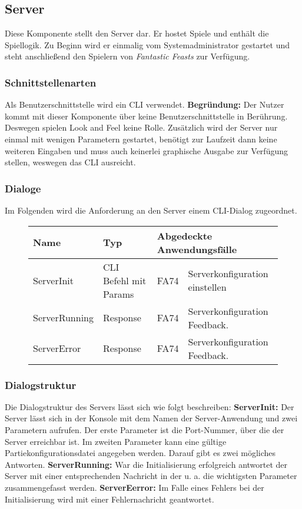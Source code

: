 \subsection{Server}
Diese Komponente stellt den Server dar. Er hostet Spiele und enthält die Spiellogik. Zu Beginn wird er einmalig vom Systemadministrator gestartet und steht anschließend den Spielern von \textit{Fantastic Feasts} zur Verfügung.

\subsubsection{Schnittstellenarten}
Als Benutzerschnittstelle wird ein CLI verwendet. \textbf{Begründung:} Der Nutzer kommt mit dieser Komponente über keine Benutzerschnittstelle in Berührung. Deswegen spielen Look and Feel keine Rolle. Zusätzlich wird der Server nur einmal mit wenigen Parametern gestartet, benötigt zur Laufzeit dann keine weiteren Eingaben und muss auch keinerlei graphische Ausgabe zur Verfügung stellen, weswegen das CLI ausreicht.

\subsubsection{Dialoge}
Im Folgenden wird die Anforderung an den Server einem CLI-Dialog zugeordnet.

\begin{figure}[H]
    \centering
    \begin{tabular}{| l l l l |}
    \hline
    \textbf{Name} & \textbf{Typ} & \multicolumn{2}{l|}{\textbf{Abgedeckte Anwendungsfälle}} \\\hline
    ServerInit & CLI Befehl mit Params & FA74 & Serverkonfiguration einstellen \\\hline
    ServerRunning & Response & FA74 & Serverkonfiguration Feedback.\\\hline
    ServerError & Response & FA74 & Serverkonfiguration Feedback.\\\hline
    
    \end{tabular}
\end{figure}

\subsubsection{Dialogstruktur}  
Die Dialogstruktur des Servers lässt sich wie folgt beschreiben: \textbf{ServerInit:} Der Server lässt sich in der Konsole mit dem Namen der Server-Anwendung und zwei Parametern aufrufen. Der erste Parameter ist die Port-Nummer, über die der Server erreichbar ist. Im zweiten Parameter kann eine gültige Partiekonfigurationsdatei angegeben werden. Darauf gibt es zwei mögliches Antworten. \textbf{ServerRunning:} War die Initialisierung erfolgreich antwortet der Server mit einer entsprechenden Nachricht in der u. a. die wichtigsten Parameter zusammengefasst werden. \textbf{ServerEerror:} Im Falle eines Fehlers bei der Initialisierung wird mit einer Fehlernachricht geantwortet.



